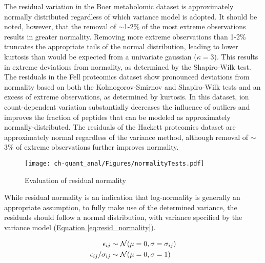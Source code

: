 The residual variation in the Boer metabolomic dataset is approximately normally distributed regardless of which variance model is adopted. It should be noted, however, that the removal of $\sim$1-2\% of the most extreme observations results in greater normality.  Removing more extreme observations than 1-2\% truncates the appropriate tails of the normal distribution, leading to lower kurtosis than would be expected from a univariate gaussian ($\kappa = 3$). This results in extreme deviations from normality, as determined by the Shapiro-Wilk test. The residuals in the Fell proteomics dataset show pronounced deviations from normality based on both the Kolmogorov-Smirnov and Shapiro-Wilk tests and an excess of extreme observations, as determined by kurtosis. In this dataset, ion count-dependent variation substantially decreases the influence of outliers and improves the fraction of peptides that can be modeled as approximately normally-distributed. The residuals of the Hackett proteomics dataset are approximately normal regardless of the variance method, although removal of $\sim$3\% of extreme observations further improves normality.

\begin{figure}[h!]
\begin{center}
\texttt{[image: ch-quant\_anal/Figures/normalityTests.pdf]}
\caption[Evaluation of residual normality]{Evaluation of residual normality}
\label{ch-quant_anal:normalityTests}
\end{center}
\end{figure}

While residual normality is an indication that log-normality is generally an appropriate assumption, to fully make use of the determined variance, the residuals should follow a normal distribution, with variance specified by the variance model (\hyperref[eq:resid_normality]{Equation \ref{eq:resid_normality}}).

\begin{align}
\epsilon_{ij} &\sim \mathcal{N}(\mu = 0, \sigma = \sigma_{ij})\notag\\
\epsilon_{ij} / \sigma_{ij} &\sim \mathcal{N}(\mu = 0, \sigma = 1)\label{eq:resid_normality}
\end{align}

